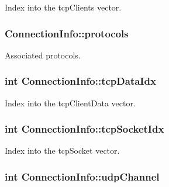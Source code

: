 Index into the tcp\-Clients vector. 

\hypertarget{structConnectionInfo_ad2f23f71b9b3e1a1ac56da62b7ef8ff0}{
\subsubsection[{protocols}]{ Connection\-Info\-::protocols}}\label{structConnectionInfo_ad2f23f71b9b3e1a1ac56da62b7ef8ff0}


Associated protocols. 

\hypertarget{structConnectionInfo_a5e710f945112e21b4f9d21f3ffff8ebf}{
\subsubsection[{tcp\-Data\-Idx}]{\setlength{\rightskip}{0pt plus 5cm}int Connection\-Info\-::tcp\-Data\-Idx}}\label{structConnectionInfo_a5e710f945112e21b4f9d21f3ffff8ebf}


Index into the tcp\-Client\-Data vector. 

\hypertarget{structConnectionInfo_af7e2bde1acff96bc414aae0b7db9c6fe}{
\subsubsection[{tcp\-Socket\-Idx}]{\setlength{\rightskip}{0pt plus 5cm}int Connection\-Info\-::tcp\-Socket\-Idx}}\label{structConnectionInfo_af7e2bde1acff96bc414aae0b7db9c6fe}


Index into the tcp\-Socket vector. 

\hypertarget{structConnectionInfo_ac364b6c833eadbb548fdde4aa1cb691e}{
\subsubsection[{udp\-Channel}]{\setlength{\rightskip}{0pt plus 5cm}int Connection\-Info\-::udp\-Channel}}\label{structConnectionInfo_ac364b6c833eadbb548fdde4aa1cb691e}


